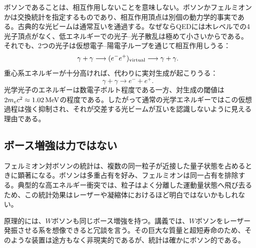 ボソンであることは、相互作用しないことを意味しない。ボソンかフェルミオンかは交換統計を指定するものであり、相互作用頂点は別個の動力学的事実である。古典的な光ビームは通常互いを通過する。なぜならQEDには木レベルでの4光子頂点がなく、低エネルギーでの光子--光子散乱は極めて小さいからである。それでも、2つの光子は仮想電子--陽電子ループを通じて相互作用しうる：
\begin{equation}
  \gamma+\gamma
  \longrightarrow(e^-e^+)_{\rm virtual}
  \longrightarrow\gamma+\gamma.
\end{equation}
重心系エネルギーが十分高ければ、代わりに実対生成が起こりうる：
\begin{equation}
  \gamma+\gamma\longrightarrow e^-+e^+.
\end{equation}
光学光子のエネルギーは数電子ボルト程度である一方、対生成の閾値は\(2m_e c^2\approx1.02\,{\rm MeV}\)の程度である。したがって通常の光学エネルギーではこの仮想過程は強く抑制され、それが交差する光ビームが互いを認識しないように見える理由である。

\begin{classroomqa}
\end{classroomqa}

\subsection{ボース増強は力ではない}

フェルミオン対ボソンの統計は、複数の同一粒子が近接した量子状態を占めるときに顕著になる。ボソンは多重占有を好み、フェルミオンは同一占有を排除する。典型的な高エネルギー衝突では、粒子はよく分離した運動量状態へ飛び去るため、この統計効果はレーザーや凝縮体におけるほど明白ではないかもしれない。

原理的には、\(W\)ボソンも同じボース増強を持つ。講義では、\(W\)ボソンをレーザー発振させる系を想像できると冗談を言う。その巨大な質量と超短寿命のため、そのような装置は途方もなく非現実的であるが、統計は確かにボソン的である。

\begin{classroomqa}
\end{classroomqa}

